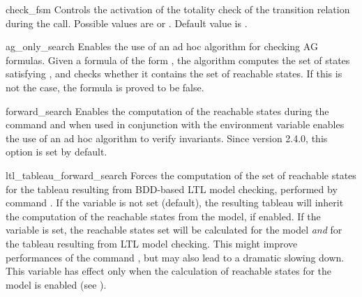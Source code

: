 \begin{nusmvVar} {check\_fsm}{}{}
Controls the activation of the totality check of the transition relation
during the \linebreak {} call. Possible values are  or
. Default value is .
\end{nusmvVar}







\begin{nusmvVar} {ag\_only\_search}{}{}
Enables the use of an ad hoc algorithm for checking AG formulas.
Given a formula of the form , the algorithm computes
the set of states satisfying , and checks whether it
contains the set of reachable states. If this is not the case, the
formula is proved to be false.
\end{nusmvVar}

\begin{nusmvVar} {forward\_search}{}{}
Enables the computation of the reachable states during the
 command and when used in conjunction with the
 environment variable enables the use of an ad hoc
algorithm to verify invariants. Since version 2.4.0, this option is
set by default.
\end{nusmvVar}


\begin{nusmvVar} {ltl\_tableau\_forward\_search}{}{}
Forces the computation of the set of reachable states for the tableau
resulting from BDD-based LTL model checking, performed by command
. If the variable
 is not set (default), the
resulting tableau will inherit the computation of the reachable states
from the model, if enabled. If the variable is set, the reachable
states set will be calculated for the model \emph{and} for the tableau
resulting from LTL model checking. This might improve performances of
the command , but may also lead to a dramatic
slowing down. This variable has effect only when the calculation of
reachable states for the model is enabled (see
).
\end{nusmvVar}

